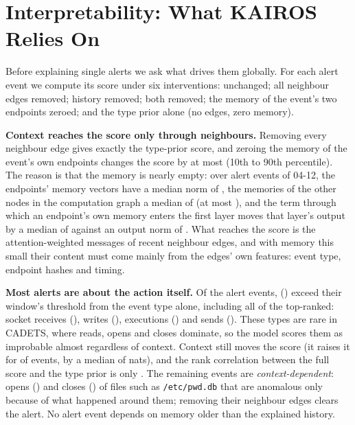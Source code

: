 \documentclass[conference]{IEEEtran}
\begin{document}
\section{Interpretability: What KAIROS Relies On}
\label{sec:interpretability}
Before explaining single alerts we ask what drives them globally. For each alert event we compute its
score under six interventions: unchanged; all neighbour edges removed; history removed; both removed;
the memory of the event's two endpoints zeroed; and the type prior alone (no edges, zero memory).

\textbf{Context reaches the score only through neighbours.} Removing every neighbour edge gives exactly
the type-prior score, and zeroing the memory of the event's own endpoints changes the score by at most
\MemZeroMaxEffect{} (10th to 90th percentile). The reason is that the memory is nearly empty: over
\MemPathN{} alert events of 04-12, the endpoints' memory vectors have a median norm of \MemPathMemNormU{},
the memories of the other nodes in the computation graph a median of \MemPathNodesNorm{} (at most
\MemPathNodesNormMax{}), and the term through which an endpoint's own memory enters the first layer moves
that layer's output by a median of \MemPathSkipNormU{} against an output norm of \MemPathConvNormU{}.
What reaches the score is the attention-weighted messages of recent neighbour edges, and with memory this
small their content must come mainly from the edges' own features: event type, endpoint hashes and timing.

\textbf{Most alerts are about the action itself.} Of the \NumAlertEvents{} alert events,
\NumPriorEvents{} (\FracPriorEvents{}) exceed their window's threshold from the event type alone,
including all \NumTopRankedPrior{} of the \NumTopRanked{} top-ranked: socket receives (\NumAlertRecv{}),
writes (\NumAlertWrite{}), executions (\NumAlertExecute{}) and sends (\NumAlertSend{}). These types are
rare in CADETS, where reads, opens and closes dominate, so the model scores them as improbable almost
regardless of context. Context still moves the score (it raises it for \FracContextRaises{} of events,
by a median of \ContextGainMedianPrior{} nats), and the rank correlation between the full score and the
type prior is only \SpearmanFullPrior{}. The remaining \NumWindowEvents{} events are
\emph{context-dependent}: opens (\NumAlertOpen{}) and closes (\NumAlertClose{}) of files such as
\texttt{/etc/pwd.db} that are anomalous only because of what happened around them; removing their
neighbour edges clears the alert. No alert event depends on memory older than the explained history.
\end{document}
